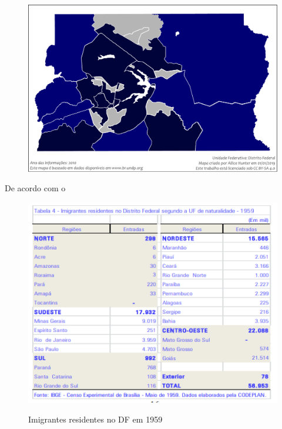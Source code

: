 \begin{figure}[h]
    \centering
    \includegraphics[width=0.9\linewidth]{Mapa_do_IDH_do_Distrito_Federal_(2010)}
    \caption{}
    \label{fig:mapadoidhdodistritofederal2010}
\end{figure}




De acordo com o 

\begin{figure}[h]
    \centering
    \includegraphics[width=0.7\linewidth]{fig/imigrantes-1959}
    \label{fig:imigrantes-1959}
    \caption{Imigrantes residentes no DF em 1959}
\end{figure}

\lipsum[1-30]

